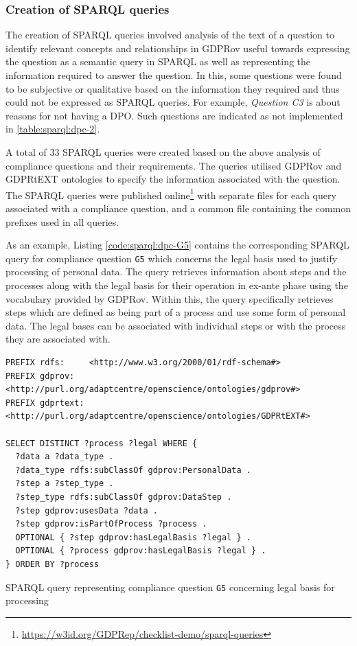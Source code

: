 \subsubsection{Creation of SPARQL queries}
The creation of SPARQL queries involved analysis of the text of a question to identify relevant concepts and relationships in GDPRov useful towards expressing the question as a semantic query in SPARQL as well as representing the information required to answer the question.
In this, some questions were found to be subjective or qualitative based on the information they required and thus could not be expressed as SPARQL queries. For example, \textit{Question C3} is about reasons for not having a DPO. Such questions are indicated as not implemented in \autoref{table:sparql:dpc-2}.

A total of 33 SPARQL queries were created based on the above analysis of compliance questions and their requirements.
The queries utilised GDPRov and GDPRtEXT ontologies to specify the information associated with the question.
The SPARQL queries were published online\footnote{\url{https://w3id.org/GDPRep/checklist-demo/sparql-queries}}
with separate files for each query associated with a compliance question, and a common file containing the common prefixes used in all queries.

As an example, Listing \autoref{code:sparql:dpc-G5} contains the corresponding SPARQL query for compliance question \texttt{G5} which concerns the legal basis used to justify processing of personal data. 
The query retrieves information about steps and the processes along with the legal basis for their operation in ex-ante phase using the vocabulary provided by GDPRov.
Within this, the query specifically retrieves steps which are defined as being part of a process and use some form of personal data. 
The legal bases can be associated with individual steps or with the process they are associated with.
\begin{listing}[htbp]
\begin{verbatim}
PREFIX rdfs:     <http://www.w3.org/2000/01/rdf-schema#>
PREFIX gdprov:   <http://purl.org/adaptcentre/openscience/ontologies/gdprov#>
PREFIX gdprtext: <http://purl.org/adaptcentre/openscience/ontologies/GDPRtEXT#>

SELECT DISTINCT ?process ?legal WHERE {
  ?data a ?data_type .
  ?data_type rdfs:subClassOf gdprov:PersonalData .
  ?step a ?step_type .
  ?step_type rdfs:subClassOf gdprov:DataStep .
  ?step gdprov:usesData ?data . 
  ?step gdprov:isPartOfProcess ?process .
  OPTIONAL { ?step gdprov:hasLegalBasis ?legal } .
  OPTIONAL { ?process gdprov:hasLegalBasis ?legal } .
} ORDER BY ?process
\end{verbatim}
\caption{SPARQL query representing compliance question \texttt{G5} concerning legal basis for processing}
\label{code:sparql:dpc-G5}
\end{listing}

